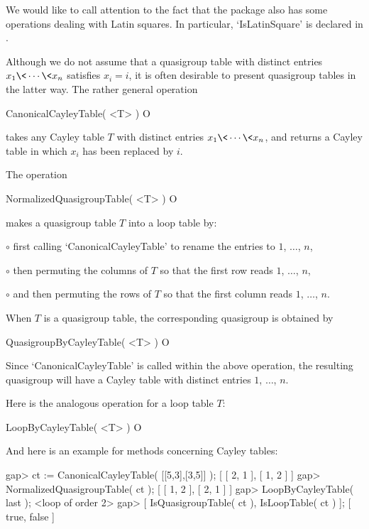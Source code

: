 We would like to call attention to the fact that the package 
also has some operations dealing with Latin squares. In particular,
`IsLatinSquare' is declared in .


Although we do not assume that a quasigroup table with distinct entries
$x_1\<\cdots\<x_n$ satisfies $x_i=i$, it is often desirable to present
quasigroup tables in the latter way. The rather general operation

\>CanonicalCayleyTable( <T> ) O

takes any Cayley table $T$ with distinct entries $x_1\<\cdots\<x_n$, and
returns a Cayley table in which $x_i$ has been replaced by $i$.

The operation

\>NormalizedQuasigroupTable( <T> ) O

makes a quasigroup table $T$ into a loop table by:
\beginlist%
\item{$\circ$} first calling `CanonicalCayleyTable' to rename the entries to $1$,
    $\dots$, $n$,
\item{$\circ$} then permuting the columns of $T$ so that the first row reads
    $1$, $\dots$, $n$,
\item{$\circ$} and then permuting the rows of $T$ so that the first column
    reads $1$, $\dots$, $n$.
\endlist


When $T$ is a quasigroup table, the corresponding quasigroup is obtained by

\>QuasigroupByCayleyTable( <T> ) O

Since `CanonicalCayleyTable' is called within the above operation, the
resulting quasigroup will have a Cayley table with distinct entries $1$,
$\dots$, $n$.

Here is the analogous operation for a loop table $T$:

\>LoopByCayleyTable( <T> ) O

And here is an example for methods concerning Cayley tables:

\beginexample
gap> ct := CanonicalCayleyTable( [[5,3],[3,5]] );
[ [ 2, 1 ], [ 1, 2 ] ]
gap> NormalizedQuasigroupTable( ct );
[ [ 1, 2 ], [ 2, 1 ] ]
gap> LoopByCayleyTable( last );
<loop of order 2>
gap> [ IsQuasigroupTable( ct ), IsLoopTable( ct ) ];
[ true, false ]
\endexample

